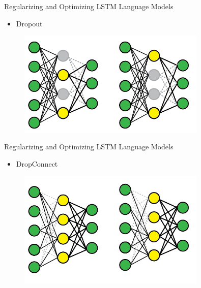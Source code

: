 \begin{frame}[c]{Regularizing and Optimizing LSTM Language Models}
\begin{itemize}
	[square]
	\item Dropout
\end{itemize}
\begin{figure}
	\centering
	\includegraphics[width=0.8\textwidth]{figures/dropout.png}
\end{figure}

\end{frame}

\begin{frame}[c]{Regularizing and Optimizing LSTM Language Models}
\begin{itemize}
[square]
\item DropConnect
\end{itemize}
\begin{figure}
\centering
\includegraphics[width=0.8\textwidth]{figures/dropconnect.png}
\end{figure}

\end{frame}

